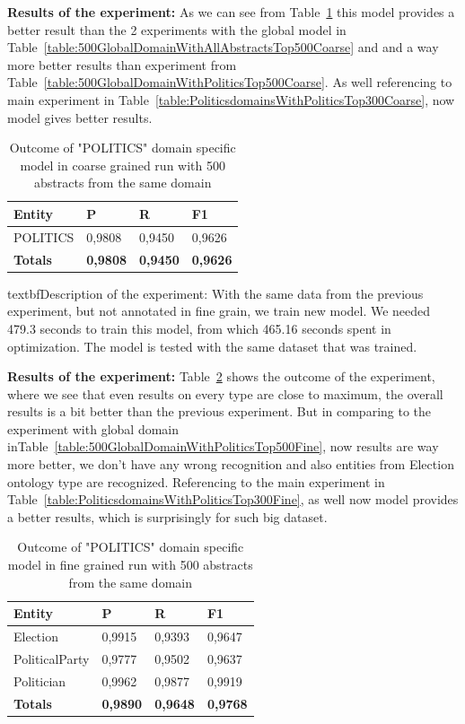 \documentclass[thesis=M,english]{FITthesis}[2018/05/30]
\begin{document}
	\textbf{Results of the experiment:} As we can see from Table~\ref{table:500PoliticsDomainWithPoliticsTop500Coarse} this model provides a better result than the 2 experiments with the global model in Table~\ref{table:500GlobalDomainWithAllAbstractsTop500Coarse} and and a way more better results than experiment from Table~\ref{table:500GlobalDomainWithPoliticsTop500Coarse}. As well referencing to main experiment in Table~\ref{table:PoliticsdomainsWithPoliticsTop300Coarse}, now model gives better results. 

	\begin{table}[H]\centering
		\begin{tabular}{|l|l|l|l|}
			\hline {\textbf{Entity}} & {\textbf{P}} & {\textbf{R}} & {\textbf{F1}}\\\hline
				POLITICS & 0,9808 & 0,9450 & 0,9626\\\hline
				\textbf{Totals} & \textbf{0,9808} & \textbf{0,9450} & \textbf{0,9626}\\\hline
		\end{tabular}
		\caption{Outcome of "POLITICS" domain specific model in coarse grained run with 500 abstracts from the same domain \label{table:500PoliticsDomainWithPoliticsTop500Coarse}}
	\end{table}

textbf{Description of the experiment:} With the same data from the previous experiment, but not annotated in fine grain, we train new model. We needed 479.3 seconds to train this model, from which 465.16 seconds spent in optimization. The model is tested with the same dataset that was trained.

	\textbf{Results of the experiment:} Table~\ref{table:500PoliticsDomainWithPoliticsTop500Fine} shows the outcome of the experiment, where we see that even results on every type are close to maximum, the overall results is a bit better than the previous experiment. But in comparing to the experiment with global domain inTable~\ref{table:500GlobalDomainWithPoliticsTop500Fine}, now results are way more better, we don't have any wrong recognition and also entities from Election ontology type are recognized. Referencing to the main experiment in Table~\ref{table:PoliticsdomainsWithPoliticsTop300Fine}, as well now model provides a better results, which is surprisingly for such big dataset.

	\begin{table}[H]\centering
		\begin{tabular}{|l|l|l|l|}
			\hline {\textbf{Entity}} & {\textbf{P}} & {\textbf{R}} & {\textbf{F1}}\\\hline
				Election & 0,9915 & 0,9393 & 0,9647\\
				PoliticalParty & 0,9777 & 0,9502 & 0,9637\\
				Politician & 0,9962 & 0,9877 & 0,9919\\\hline
				\textbf{Totals} & \textbf{0,9890} & \textbf{0,9648} & \textbf{0,9768}\\\hline
		\end{tabular}
		\caption{Outcome of "POLITICS" domain specific model in fine grained run with 500 abstracts from the same domain \label{table:500PoliticsDomainWithPoliticsTop500Fine}}
	\end{table}	
	
\end{document}
